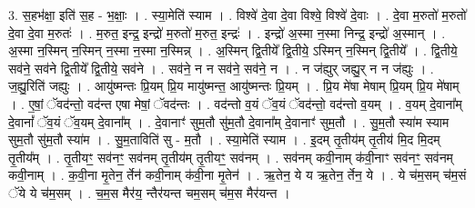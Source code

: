 \documentclass[17pt]{extarticle}
\begin{document}
3. स॒हभ॑क्षा॒ इति॑ स॒ह - भ॒क्षाः॒ । . स्या॒मेति॑ स्याम । . विश्वे॑ दे॒वा दे॒वा विश्वे॒ विश्वे॑ दे॒वाः । . दे॒वा म॒रुतो॑ म॒रुतो॑ दे॒वा दे॒वा म॒रुतः॑ । . म॒रुत॒ इन्द्र॒ इन्द्रो॑ म॒रुतो॑ म॒रुत॒ इन्द्रः॑ । . इन्द्रो॑ अ॒स्मा न॒स्मा निन्द्र॒ इन्द्रो॑ अ॒स्मान् । . अ॒स्मा न॒स्मिन् न॒स्मिन् न॒स्मा न॒स्मा न॒स्मिन्न् । . अ॒स्मिन् द्वि॒तीये᳚ द्वि॒तीये॒ ऽस्मिन् न॒स्मिन् द्वि॒तीये᳚ । . द्वि॒तीये॒ सव॑ने॒ सव॑ने द्वि॒तीये᳚ द्वि॒तीये॒ सव॑ने । . सव॑ने॒ न न सव॑ने॒ सव॑ने॒ न । . न ज॑ह्युर् जह्यु॒र् न न ज॑ह्युः । . ज॒ह्यु॒रिति॑ जह्युः । . आयु॑ष्मन्तः प्रि॒यम् प्रि॒य मायु॑ष्मन्त॒ आयु॑ष्मन्तः प्रि॒यम् । . प्रि॒य मे॑षा मेषाम् प्रि॒यम् प्रि॒य मे॑षाम् । . ए॒षां॒ ॅवद॑न्तो॒ वद॑न्त एषा मेषां॒ ॅवद॑न्तः । . वद॑न्तो व॒यं ॅव॒यं ॅवद॑न्तो॒ वद॑न्तो व॒यम् । . व॒यम् दे॒वाना᳚म् दे॒वानां᳚ ॅव॒यं ॅव॒यम् दे॒वाना᳚म् । . दे॒वानाꣳ॑ सुम॒तौ सु॑म॒तौ दे॒वाना᳚म् दे॒वानाꣳ॑ सुम॒तौ । . सु॒म॒तौ स्या॑म स्याम सुम॒तौ सु॑म॒तौ स्या॑म । . सु॒म॒ताविति॑ सु - म॒तौ । . स्या॒मेति॑ स्याम । . इ॒दम् तृ॒तीय॑म् तृ॒तीय॑ मि॒द मि॒दम् तृ॒तीय᳚म् । . तृ॒तीयꣳ॒॒ सव॑नꣳ॒॒ सव॑नम् तृ॒तीय॑म् तृ॒तीयꣳ॒॒ सव॑नम् । . सव॑नम् कवी॒नाम् क॑वी॒नाꣳ सव॑नꣳ॒॒ सव॑नम् कवी॒नाम् । . क॒वी॒ना मृ॒तेन॒ र्तेन॑ कवी॒नाम् क॑वी॒ना मृ॒तेन॑ । . ऋ॒तेन॒ ये य ऋ॒तेन॒ र्तेन॒ ये । . ये च॑म॒सम् च॑म॒सं ॅये ये च॑म॒सम् । . च॒म॒स मैर॑य॒ न्तैर॑यन्त चम॒सम् च॑म॒स मैर॑यन्त । \newline
\end{document}
